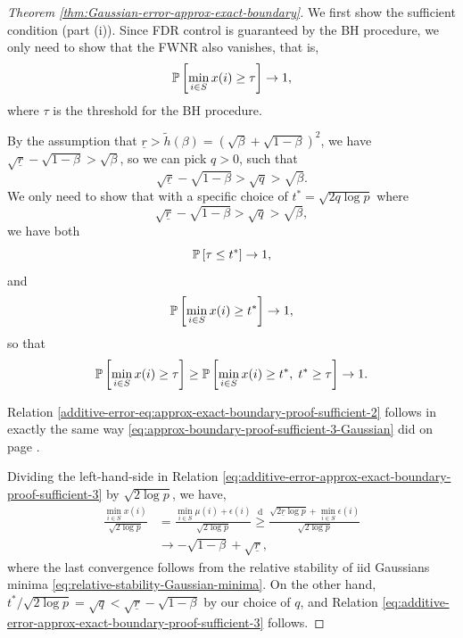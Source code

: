 \begin{proof}[Theorem \ref{thm:Gaussian-error-approx-exact-boundary}]
We first show the sufficient condition (part {\rm (i)}).
Since FDR control is guaranteed by the BH procedure, we only need to show that the FWNR also vanishes, that is,
\begin{equation} \label{eq:approx-exact-boundary-proof-sufficient-1-Gaussian}
    \P\left[\min_{i\in S}x(i) \ge \tau\right] \to 1,
\end{equation}
where $\tau$ is the threshold for the BH procedure.

By the assumption that $\underline{r}>\widetilde{h}(\beta)=(\sqrt{\beta}+\sqrt{1-\beta})^2$, we have $\sqrt{\underline{r}}-\sqrt{1-\beta}>\sqrt{\beta}$, so we can pick $q>0$, such that 
\begin{equation} \label{eq:approx-exact-boundary-proof-sufficient-2-Gaussian}
\sqrt{\underline{r}}-\sqrt{1-\beta}>\sqrt{q}>\sqrt{\beta}.
\end{equation}
We only need to show that with a specific choice of $t^*=\sqrt{2q\log{p}}$ where
\begin{equation} \label{eq:additive-error-approx-exact-boundary-proof-sufficient-1}
\sqrt{\underline{r}}-\sqrt{1-\beta}>\sqrt{q}>\sqrt{\beta},
\end{equation}
we have both
\begin{equation} \label{additive-error-eq:approx-exact-boundary-proof-sufficient-2}
\P\left[\tau\le t^*\right]\to 1,
\end{equation}
and 
\begin{equation} \label{eq:additive-error-approx-exact-boundary-proof-sufficient-3}
    \P\left[\min_{i\in S}x(i) \ge t^* \right] \to 1,
\end{equation}
so that 
\begin{equation*} 
    \P\left[\min_{i\in S}x(i) \ge \tau\right] \ge 
    \P\left[\min_{i\in S}x(i) \ge t^*,\; t^* \ge \tau\right] \to 1.
\end{equation*}

Relation \eqref{additive-error-eq:approx-exact-boundary-proof-sufficient-2} follows in exactly the same way \eqref{eq:approx-boundary-proof-sufficient-3-Gaussian} did on page  \pageref{eq:approx-boundary-proof-sufficient-3-Gaussian}.

Dividing the left-hand-side in Relation \eqref{eq:additive-error-approx-exact-boundary-proof-sufficient-3} by $\sqrt{2\log{p}}$, we have,
\begin{align*}
    \frac{\min_{i\in S}x(i)}{\sqrt{2\log{p}}} 
    &= \frac{\min_{i\in S}\mu(i)+\epsilon(i)}{\sqrt{2\log{p}}} 
    \stackrel{\mathrm{d}}{\ge} \frac{\sqrt{2\underline{r}\log{p}} + \min_{i\in S}\epsilon(i)}{\sqrt{2\log{p}}} \\
    &\to -\sqrt{1-\beta} + \sqrt{\underline{r}},
\end{align*}
where the last convergence follows from the relative stability of iid Gaussians minima \eqref{eq:relative-stability-Gaussian-minima}. 
On the other hand, ${t^*}/{\sqrt{2\log{p}}}=\sqrt{q}<\sqrt{\underline{r}}-\sqrt{1-\beta}$ by our choice of ${q}$, and Relation \eqref{eq:additive-error-approx-exact-boundary-proof-sufficient-3} follows.



\end{proof}
